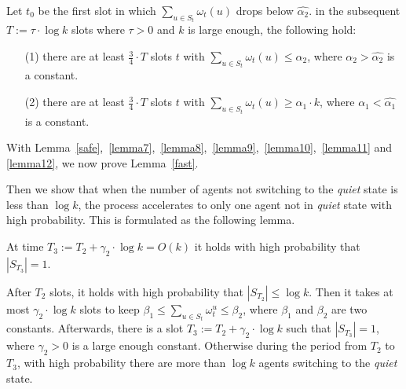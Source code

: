 \begin{lemma}
    \label{lemma12}
    Let $t_0$ be the first slot in which ${\sum}_{u\in S_t}\omega_t(u)$
    drops below $\hat{\alpha_2}$. in the subsequent $T :=\tau\cdot\log k$ slots
    where $\tau > 0$ and $k$ is large enough, the following hold:
    \begin{itemize}
        \item[(1)] there are at least $\frac{3}{4}\cdot T$ slots $t$
        with ${\sum}_{u\in S_t}\omega_t(u) \leq \alpha_2$, where $\alpha_2 > \hat{\alpha_2}$
        is a constant.
        \item[(2)] there are at least $\frac{3}{4}\cdot T$ slots $t$
        with ${\sum}_{u\in S_t}\omega_t(u) \geq \alpha_1\cdot k$, where $\alpha_1 < \hat{\alpha_1}$
        is a constant.
    \end{itemize}
\end{lemma}


With Lemma~\ref{safe},~\ref{lemma7},~\ref{lemma8},~\ref{lemma9},~\ref{lemma10},~\ref{lemma11} and
\ref{lemma12}, we now prove Lemma~\ref{fast}.


Then we show that when the number of agents not switching to 
the \emph{quiet} state is less than $\log k$, the process accelerates to 
only one agent not in \emph{quiet} state with high probability.
This is formulated as the following lemma.

\begin{lemma}
    \label{slow}
    At time $T_3 :=T_2 +\gamma_2 \cdot \log k = O(k)$ it holds with high
    probability that $|S_{T_3}| = 1$.
\end{lemma}
\begin{IEEEproof}
    After $T_2$ slots, it holds with high probability 
    that $|S_{T_2}| \leq \log k$. Then it takes at most $\gamma_2 \cdot \log k$
    slots to keep $\beta_1 \leq \sum_{u\in S_t} \omega_t^u \leq \beta_2$,
    where $\beta_1$ and $\beta_2$ are two constants.
    Afterwards, there is a slot $T_3 :=T_2 +\gamma_2\cdot\log k$ such that
    $|S_{T_3}| = 1$, where $\gamma_2 > 0$ is a large enough constant. 
    Otherwise during the period from $T_2$ to $T_3$,
    with high probability there are 
    more than $\log k$ agents switching to
    the \emph{quiet} state.
\end{IEEEproof}

